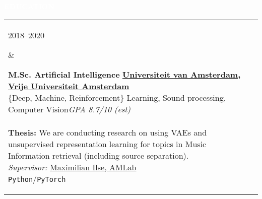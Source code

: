 \documentclass{article}
\newcommand{\cvsect}[1]{
	\vspace{0.5\baselineskip}
	\colorbox{primary}{\textcolor{white}{\MakeUppercase{\textbf{#1}}}}\\
}
\newenvironment{entrylist}{
	\begin{longtable}[H]{l l}
}{
	\end{longtable}
}
\newcommand{\entry}[4]{%
	\parbox[t]{0.175\linewidth}{#1} &
	\parbox[t]{0.825\linewidth}{
		\textbf{#2}%
		\hfill%
		{\footnotesize \textbf{\textcolor{black}{#3}}}\\%
		{\small #4} %
    }\\\\}
\newcommand{\slashsep}{\hspace{2mm}/\hspace{2mm}}
\begin{document}
\cvsect{Education}
\begin{entrylist}
    \entry{2018--2020}
    {M.Sc. Artificial Intelligence}
    {\href{https://uva.nl}{Universiteit van Amsterdam}, \href{https://vu.nl}{Vrije Universiteit Amsterdam}}
    {
        \{Deep, Machine, Reinforcement\} Learning, Sound processing, Computer Vision\hfill\textit{GPA 8.7/10 \scriptsize{(est)}}\\
        \\
        \textbf{Thesis:} We are conducting research on using VAEs and unsupervised representation learning for topics in Music Information retrieval (including source separation).\\
        \emph{Supervisor:} \href{https://scholar.google.com/citations?user=KNJIRGkAAAAJ}{Maximilian Ilse, AMLab}\\
        \texttt{Python}\slashsep\texttt{PyTorch}
    }

    \entry{2014--2017}
    {B.Sc. Applied Computer Science}
    {\href{https://www.uni-heidelberg.de/en}{University Heidelberg}}
    {
        \textit{Focus}: Image processing and pattern recognition\hfill\textit{GPA 3.48/4}\\
        \\
        \textbf{\href{https://github.com/morris-frank/ba_latex/blob/master/thesis.pdf}{Thesis:}} Using a FCN-ResNet based detector the thesis provides a reverse image search tool here in particular to retrieve art historic images containing an object given by a reference image.\\
        \emph{Supervisor:} \href{https://scholar.google.com/citations?user=ZrRs-qoAAAAJ}{Dr.\ Miguel Bautista Martin}, \href{https://hci.iwr.uni-heidelberg.de/Staff/bommer}{Prof.\ Dr.\ Björn Ommer}\\
        \texttt{Python}\slashsep\texttt{Caffe}\slashsep\texttt{Keras}\\
    }

    \entry{2013--2014}
    {B.Sc. Physics}
    {\href{https://www.uni-heidelberg.de/en}{University Heidelberg}}
    {Change of degree after the second semester, kept as minor studies}

\end{entrylist}
\end{document}
